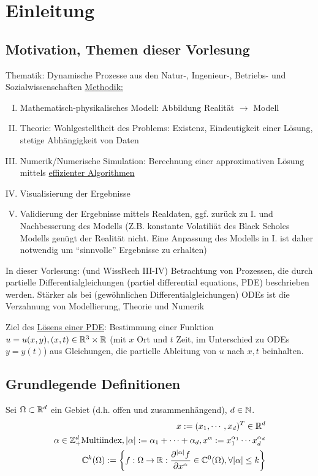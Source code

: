 \chapter{Einleitung}
\section{Motivation, Themen dieser Vorlesung}
Thematik: Dynamische Prozesse aus den Natur-, Ingenieur-, Betriebs- und Sozialwissenschaften
\underline{Methodik:} 
\begin{enumerate}[I.]
        \item Mathematisch-physikalisches Modell: Abbildung Realität $\rightarrow$ Modell
        \item Theorie: Wohlgestelltheit des Problems: Existenz, Eindeutigkeit einer Lösung, stetige Abhängigkeit von Daten
        \item Numerik/Numerische Simulation: Berechnung einer approximativen Lösung mittels \underline{effizienter Algorithmen}
        \item Visualisierung der Ergebnisse
        \item Validierung der Ergebnisse mittels Realdaten, ggf. zurück zu I. und Nachbesserung des Modells (Z.B. konstante Volatiliät des Black Scholes Modells genügt der Realität nicht. Eine Anpassung des Modells in I. ist daher notwendig um ``sinnvolle'' Ergebnisse zu erhalten)
\end{enumerate}

In dieser Vorlesung: (und WissRech III-IV)
Betrachtung von Prozessen, die durch partielle Differentialgleichungen (partiel differential equations, PDE) beschrieben werden.
Stärker als bei (gewöhnlichen Differentialgleichungen) ODEs ist die Verzahnung von Modellierung, Theorie und Numerik

Ziel des \underline{Lösens einer PDE}: Bestimmung einer Funktion $u=u(x,y), (x,t)\in \mathbb{R}^3\times\mathbb{R}$ (mit $x$ Ort und $t$ Zeit, im Unterschied zu ODEs $y=y(t)$) aus Gleichungen, die partielle Ableitung von $u$ nach $x,t$ beinhalten. 

\section*{Grundlegende Definitionen}
Sei $\Omega \subset \mathbb{R}^d$ ein Gebiet (d.h. offen und zusammenhängend), $d\in\mathbb{N}$.
\begin{eqnarray*}
     x:=(x_1, \cdots, x_d)^T\in\mathbb{R}^d\\
     \alpha\in\mathbb{Z}_+^d \text{Multiindex}, |\alpha| := \alpha_1+\cdots+\alpha_d, x^\alpha:=x_1^{\alpha_1} \cdots x_d^{\alpha_d}\\
    \mathbb{C}^k(\Omega) := \left\{ f:\Omega\to\mathbb{R}: \frac{\partial^{|\alpha|}f}{\partial x^\alpha} \in \mathbb{C}^0(\Omega), \forall |\alpha|\leq k \right\}
\end{eqnarray*}

